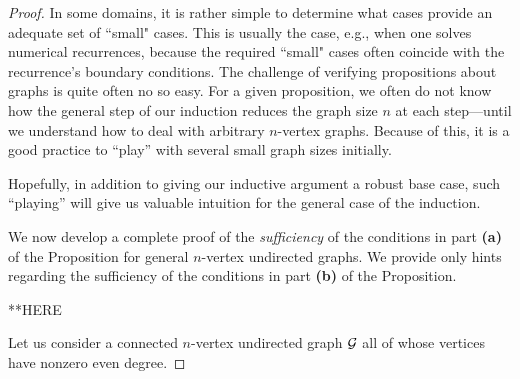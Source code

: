 \begin{proof}
{\begin{minipage}{0.95\textwidth}
\smallskip

In some domains, it is rather simple to determine what cases provide an adequate set of
``small" cases.  This is usually the case, e.g., when one solves numerical recurrences, because
the required ``small" cases often coincide with the recurrence's boundary conditions.  The
challenge of verifying propositions about graphs is quite often no so easy.  For a given
proposition, we often do not know how the general step of our induction reduces
the graph size $n$ at each step---until we understand how to deal with arbitrary $n$-vertex
graphs.  Because of this, it is a good practice to ``play'' with several small graph sizes initially.

\smallskip

Hopefully, in addition to giving our inductive argument a robust base case, such ``playing'' will
give us valuable intuition for the general case of the induction.
\end{minipage}
}

\medskip


We now develop a complete proof of the {\em sufficiency} of the conditions in 
part {\bf (a)} of the Proposition for general $n$-vertex undirected graphs.  We 
provide only hints regarding the sufficiency of the conditions in part {\bf (b)} of the Proposition.

**HERE

Let us consider a connected $n$-vertex undirected graph $\mbox{$\cal G$}$ all of
whose vertices have nonzero even degree.


\end{proof}
